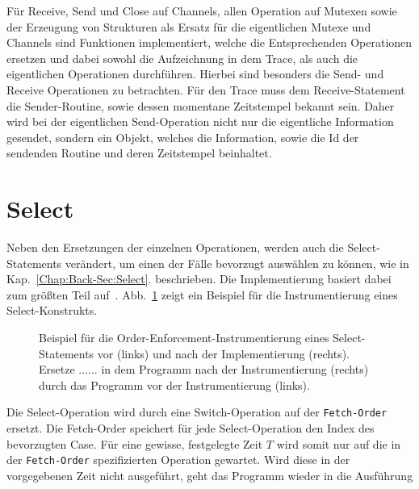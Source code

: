 Für Receive, Send und Close auf Channels,  allen Operation auf Mutexen sowie 
der Erzeugung von Strukturen als Ersatz für die eigentlichen Mutexe und Channels 
sind Funktionen implementiert, welche die Entsprechenden Operationen 
ersetzen und dabei sowohl die Aufzeichnung in dem Trace, als auch die eigentlichen
Operationen durchführen. Hierbei sind besonders die Send- und Receive Operationen 
zu betrachten. Für den Trace muss dem Receive-Statement die Sender-Routine, sowie 
dessen momentane 
Zeitstempel bekannt sein. Daher wird bei der eigentlichen
Send-Operation nicht nur die eigentliche Information gesendet, sondern ein  
Objekt, welches die Information, sowie die Id der sendenden Routine und deren
Zeitstempel beinhaltet.

\section{Select}\label{Chap:Inst-Sec:Select}
Neben den Ersetzungen der einzelnen Operationen, werden auch die Select-Statements 
verändert, um einen der Fälle bevorzugt auswählen zu können, wie in Kap.~\ref{Chap:Back-Sec:Select}.
beschrieben. Die Implementierung basiert dabei zum größten Teil auf~\cite{gfuzz}.
Abb.~\ref{Chap:Analyze-Sec:Channel-SubSec:Select-Fig:GFuzz_Inst} zeigt ein 
Beispiel für die Instrumentierung eines Select-Konstrukts.
\begin{figure}[h!]
  \begin{minipage}[t]{0.3\textwidth}
    
  \end{minipage}
  \begin{minipage}[t]{0.65\textwidth}
    
  \end{minipage}
  \caption{Beispiel für die Order-Enforcement-Instrumentierung eines Select-Statements 
  vor (links) und nach der Implementierung (rechts). Ersetze $......$
  in dem Programm nach der Instrumentierung (rechts) durch das Programm vor der 
  Instrumentierung (links).~\cite[gekürzt]{gfuzz}}
  \label{Chap:Analyze-Sec:Channel-SubSec:Select-Fig:GFuzz_Inst}
\end{figure}
Die Select-Operation wird durch eine Switch-Operation auf der \texttt{Fetch-Order}
ersetzt. Die Fetch-Order speichert für jede Select-Operation den Index des bevorzugten
Case. Für eine gewisse, festgelegte Zeit $T$ wird somit nur auf die in der 
\texttt{Fetch-Order} spezifizierten Operation gewartet. Wird diese in der 
vorgegebenen Zeit nicht ausgeführt, geht das Programm wieder in die Ausführung
